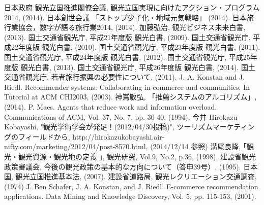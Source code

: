 
\begin{thebibliography}{report}
 日本政府 観光立国推進閣僚会議, 観光立国実現に向けたアクション・プログラム2014, (2014).
 日本創世会議 「ストップ少子化・地域元気戦略」 (2014).
 日本旅行業協会，数字が語る旅行業2014, (2014).
 加藤弘治, 観光ビジネス未来白書, (2013).
 国土交通省観光庁, 平成21年度版 観光白書, (2009).
 国土交通省観光庁, 平成22年度版 観光白書, (2010).
 国土交通省観光庁, 平成23年度版 観光白書, (2011).
 国土交通省観光庁, 平成24年度版 観光白書, (2012).
 国土交通省観光庁, 平成25年度版 観光白書, (2013).
 国土交通省観光庁, 平成26年度版 観光白書, (2014).
 国土交通省観光庁, 若者旅行振興の必要性について, (2011).
 J. A. Konstan and J. Riedl. Recommender systems: Collaborating in commerce and communities. In Tutorial at ACM CHI2003, (2003).
 神嶌敏弘, 「推薦システムのアルゴリズム」, (2014).
 P. Maes. Agents that reduce work and information overload. Communications of ACM, Vol. 37, No. 7, pp. 30-40, (1994).
 今井
 Hirokazu Kobayashi, "観光学術学会が発足！(2012/04/30投稿)", ツーリズムマーケティングのフィールドから, http://hirokazukobayashi.air-nifty.com/marketing/2012/04/post-8570.html, (2014/12/14 参照)
 溝尾良隆, ｢観光・観光資源・観光地の定義 ｣, 観光研究, Vol.9, No.2, p.36, (1998).
 建設省観光政策審議会, 今後の観光政策の基本的な方向について（答申39号）, (1995).
 日本国, 観光立国推進基本法, (2007).
 建設省道路局, 観光レクリエーション交通調査, (1974)
 J. Ben Schafer, J. A. Konstan, and J. Riedl. E-commerce recommendation applications. Data Mining and Knowledge Discovery, Vol. 5, pp. 115-153, (2001).
\end{thebibliography}
